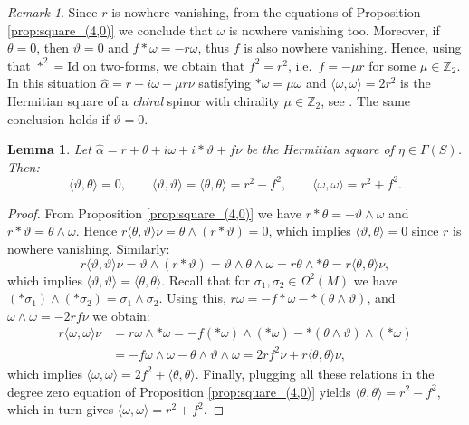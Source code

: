 \documentclass[10pt,a4paper,twoside,reqno]{amsart}
\theoremstyle{plain}
\newtheorem{lemma}[thm]{Lemma}
\theoremstyle{definition}
\theoremstyle{remark}
\newtheorem{remark}[thm]{Remark}
\def\Z{\mathbb{Z}}
\def\Id{\mathrm{Id}}
\newcommand{\escal}[1]{\langle#1\rangle}
\begin{document}
\begin{remark}
    Since $r$ is nowhere vanishing, from the equations of Proposition \ref{prop:square_(4,0)} we conclude that $\omega$ is nowhere vanishing too. Moreover, if $\theta=0$, then $\vartheta=0$ and $f*\omega=-r\omega$, thus $f$ is also nowhere vanishing. Hence, using that $*^2=\Id$ on two-forms, we obtain that $f^2=r^2$, i.e.\ $f=-\mu r$ for some $\mu\in\Z_2$. In this situation $\widehat{\alpha}=r+i\omega-\mu r\nu$ satisfying $*\omega=\mu\omega$ and $\escal{\omega,\omega}=2r^2$ is the Hermitian square of a \emph{chiral} spinor with chirality $\mu\in\Z_2$, see \cite[Cor.\ 5.7]{Algebraic_Complex_Square_2025}. The same conclusion holds if $\vartheta=0$.
\end{remark}

\begin{lemma}\label{lemma:square_(4,0)_scalar_part}
    Let $\widehat{\alpha}=r+\theta+i\omega+i*\vartheta+f\nu$ be the Hermitian square of $\eta\in\Gamma(S)$. Then: $$\escal{\vartheta,\theta}=0,\qquad \escal{\vartheta,\vartheta}=\escal{\theta,\theta}=r^2-f^2,\qquad \escal{\omega,\omega}=r^2+f^2.$$
\end{lemma}

\begin{proof}
    From Proposition \ref{prop:square_(4,0)} we have $r*\theta=-\vartheta\wedge\omega$ and $r*\vartheta=\theta\wedge\omega$. Hence $r\escal{\theta,\vartheta}\nu=\theta\wedge(r*\vartheta)=0$, which implies $\escal{\vartheta,\theta}=0$ since $r$ is nowhere vanishing. Similarly: $$r\escal{\vartheta,\vartheta}\nu=\vartheta\wedge(r*\vartheta)=\vartheta\wedge\theta\wedge\omega=r\theta\wedge*\theta=r\escal{\theta,\theta}\nu,$$ which implies $\escal{\vartheta,\vartheta}=\escal{\theta,\theta}$. Recall that for $\sigma_1,\sigma_2\in\Omega^2(M)$ we have $(*\sigma_1)\wedge(*\sigma_2)=\sigma_1\wedge\sigma_2$. Using this, $r\omega=-f*\omega-*(\theta\wedge\vartheta)$, and $\omega\wedge\omega=-2rf\nu$ we obtain: \begin{align*}
        r\escal{\omega,\omega}\nu&=r\omega\wedge*\omega=-f(*\omega)\wedge(*\omega)-*(\theta\wedge\vartheta)\wedge(*\omega)\\
        &=-f\omega\wedge\omega-\theta\wedge\vartheta\wedge\omega=2rf^2\nu+r\escal{\theta,\theta}\nu,
    \end{align*} which implies $\escal{\omega,\omega}=2f^2+\escal{\theta,\theta}$. Finally, plugging all these relations in the degree zero equation of Proposition \ref{prop:square_(4,0)} yields $\escal{\theta,\theta}=r^2-f^2$, which in turn gives $\escal{\omega,\omega}=r^2+f^2$.
\end{proof}
\end{document}
